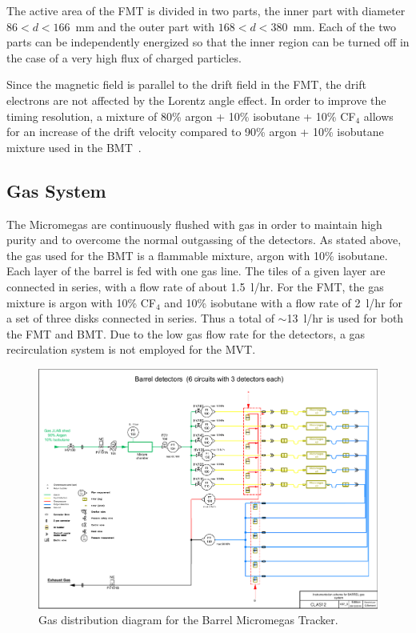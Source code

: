 The active area of the FMT is divided in two parts, the inner part with diameter $86 < d < 166$~mm and the outer part with
$168 < d < 380$~mm. Each of the two parts can be independently energized so that the inner region can be turned off in the
case of a very high flux of charged particles.

Since the magnetic field is parallel to the drift field in the FMT, the drift electrons are not affected by the Lorentz angle
effect. In order to improve the timing resolution, a mixture of 80\% argon + 10\% isobutane + 10\% CF$_4$ allows for an
increase of the drift velocity compared to 90\% argon + 10\% isobutane mixture used in the BMT~\cite{GAS}. 

\subsection{Gas System}

The Micromegas are continuously flushed with gas in order to maintain high purity and to overcome the normal outgassing
of the detectors. As stated above, the gas used for the BMT is a flammable mixture, argon with 10\% isobutane. Each
layer of the barrel is fed with one gas line. The tiles of a given layer are connected in series, with a flow rate of about
1.5~l/hr. For the FMT, the gas mixture is argon with 10\% CF$_4$ and 10\% isobutane with a flow rate of 2~l/hr for a
set of three disks connected in series. Thus a total of $\sim$13~l/hr is used for both the FMT and BMT. Due to the low
gas flow rate for the detectors, a gas recirculation system is not employed for the MVT. 

\begin{figure}[htb]
\includegraphics[width=2\columnwidth,keepaspectratio]{images/Clas12_Barrel_V07_2}
 \caption{Gas distribution diagram for the Barrel Micromegas Tracker.}
 \label{fig:mm-gas-sys-barrel}
\end{figure}



